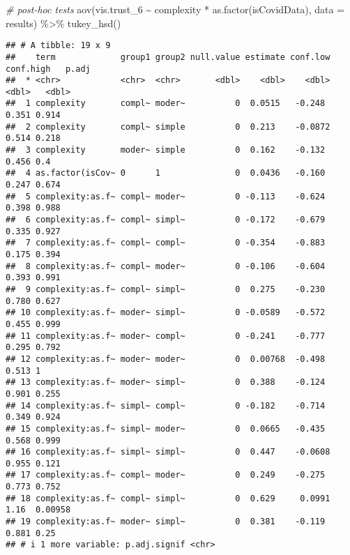 \documentclass[
]{article}
\newenvironment{Shaded}{\begin{snugshade}}{\end{snugshade}}
\newcommand{\AttributeTok}[1]{\textcolor[rgb]{0.77,0.63,0.00}{#1}}
\newcommand{\CommentTok}[1]{\textcolor[rgb]{0.56,0.35,0.01}{\textit{#1}}}
\newcommand{\FunctionTok}[1]{\textcolor[rgb]{0.00,0.00,0.00}{#1}}
\newcommand{\NormalTok}[1]{#1}
\newcommand{\SpecialCharTok}[1]{\textcolor[rgb]{0.00,0.00,0.00}{#1}}
\begin{document}
\begin{Shaded}
\begin{Highlighting}[]
\CommentTok{\# post{-}hoc tests}
\FunctionTok{aov}\NormalTok{(vis.trust\_6 }\SpecialCharTok{\textasciitilde{}}\NormalTok{ complexity }\SpecialCharTok{*} \FunctionTok{as.factor}\NormalTok{(isCovidData), }\AttributeTok{data =}\NormalTok{ results) }\SpecialCharTok{\%\textgreater{}\%} \FunctionTok{tukey\_hsd}\NormalTok{()}
\end{Highlighting}
\end{Shaded}

\begin{verbatim}
## # A tibble: 19 x 9
##    term             group1 group2 null.value estimate conf.low conf.high   p.adj
##  * <chr>            <chr>  <chr>       <dbl>    <dbl>    <dbl>     <dbl>   <dbl>
##  1 complexity       compl~ moder~          0  0.0515   -0.248      0.351 0.914  
##  2 complexity       compl~ simple          0  0.213    -0.0872     0.514 0.218  
##  3 complexity       moder~ simple          0  0.162    -0.132      0.456 0.4    
##  4 as.factor(isCov~ 0      1               0  0.0436   -0.160      0.247 0.674  
##  5 complexity:as.f~ compl~ moder~          0 -0.113    -0.624      0.398 0.988  
##  6 complexity:as.f~ compl~ simpl~          0 -0.172    -0.679      0.335 0.927  
##  7 complexity:as.f~ compl~ compl~          0 -0.354    -0.883      0.175 0.394  
##  8 complexity:as.f~ compl~ moder~          0 -0.106    -0.604      0.393 0.991  
##  9 complexity:as.f~ compl~ simpl~          0  0.275    -0.230      0.780 0.627  
## 10 complexity:as.f~ moder~ simpl~          0 -0.0589   -0.572      0.455 0.999  
## 11 complexity:as.f~ moder~ compl~          0 -0.241    -0.777      0.295 0.792  
## 12 complexity:as.f~ moder~ moder~          0  0.00768  -0.498      0.513 1      
## 13 complexity:as.f~ moder~ simpl~          0  0.388    -0.124      0.901 0.255  
## 14 complexity:as.f~ simpl~ compl~          0 -0.182    -0.714      0.349 0.924  
## 15 complexity:as.f~ simpl~ moder~          0  0.0665   -0.435      0.568 0.999  
## 16 complexity:as.f~ simpl~ simpl~          0  0.447    -0.0608     0.955 0.121  
## 17 complexity:as.f~ compl~ moder~          0  0.249    -0.275      0.773 0.752  
## 18 complexity:as.f~ compl~ simpl~          0  0.629     0.0991     1.16  0.00958
## 19 complexity:as.f~ moder~ simpl~          0  0.381    -0.119      0.881 0.25   
## # i 1 more variable: p.adj.signif <chr>
\end{verbatim}
\end{document}
